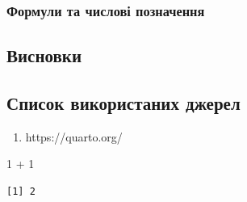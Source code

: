 \documentclass[
  letterpaper,
  DIV=11,
  numbers=noendperiod]{scrartcl}
\newenvironment{Shaded}{\begin{snugshade}}{\end{snugshade}}
\newcommand{\DecValTok}[1]{\textcolor[rgb]{0.68,0.00,0.00}{#1}}
\newcommand{\SpecialCharTok}[1]{\textcolor[rgb]{0.37,0.37,0.37}{#1}}
\providecommand{\tightlist}{%
  \setlength{\itemsep}{0pt}\setlength{\parskip}{0pt}}\usepackage{longtable,booktabs,array}
\begin{document}
\hypertarget{ux444ux43eux440ux43cux443ux43bux438-ux442ux430-ux447ux438ux441ux43bux43eux432ux456-ux43fux43eux437ux43dux430ux447ux435ux43dux43dux44f}{%
\subsubsection{Формули та числові
позначення}\label{ux444ux43eux440ux43cux443ux43bux438-ux442ux430-ux447ux438ux441ux43bux43eux432ux456-ux43fux43eux437ux43dux430ux447ux435ux43dux43dux44f}}

\hypertarget{ux432ux438ux441ux43dux43eux432ux43aux438}{%
\subsection{Висновки}\label{ux432ux438ux441ux43dux43eux432ux43aux438}}

\hypertarget{ux441ux43fux438ux441ux43eux43a-ux432ux438ux43aux43eux440ux438ux441ux442ux430ux43dux438ux445-ux434ux436ux435ux440ux435ux43b}{%
\subsection{Список використаних
джерел}\label{ux441ux43fux438ux441ux43eux43a-ux432ux438ux43aux43eux440ux438ux441ux442ux430ux43dux438ux445-ux434ux436ux435ux440ux435ux43b}}

\begin{enumerate}
\def\labelenumi{\arabic{enumi}.}
\tightlist
\item
  https://quarto.org/
\end{enumerate}

\begin{Shaded}
\begin{Highlighting}[numbers=left,,]
\DecValTok{1} \SpecialCharTok{+} \DecValTok{1}
\end{Highlighting}
\end{Shaded}

\begin{verbatim}
[1] 2
\end{verbatim}
\end{document}
